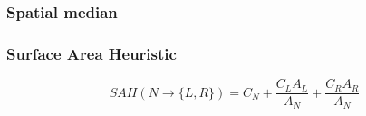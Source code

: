 





\subsubsection{Spatial median}







\subsubsection{Surface Area Heuristic}



\begin{displaymath}
  SAH(N \rightarrow \{L, R\}) = C_N + \frac{C_L A_L}{A_N} +
  \frac{C_R A_R}{A_N}
\end{displaymath}

